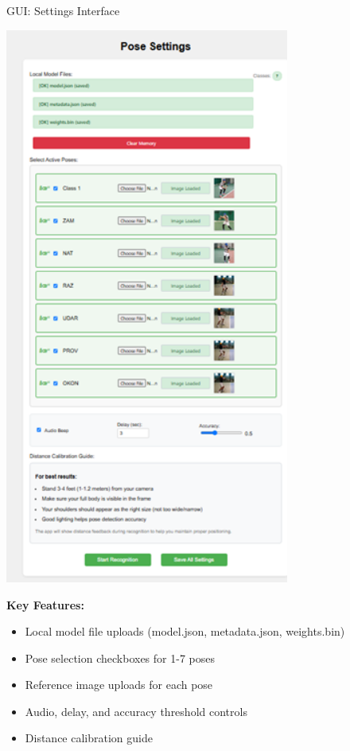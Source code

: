 \documentclass[11pt]{beamer}
\begin{document}
\begin{frame}{GUI: Settings Interface}
    \begin{center}
        \includegraphics[width=0.7\textwidth]{GUI1_1752049448296.png}
    \end{center}
    \small{
    \textbf{Key Features:}
    \begin{itemize}
        \item Local model file uploads (model.json, metadata.json, weights.bin)
        \item Pose selection checkboxes for 1-7 poses
        \item Reference image uploads for each pose
        \item Audio, delay, and accuracy threshold controls
        \item Distance calibration guide
    \end{itemize}
    }
\end{frame}
\end{document}

